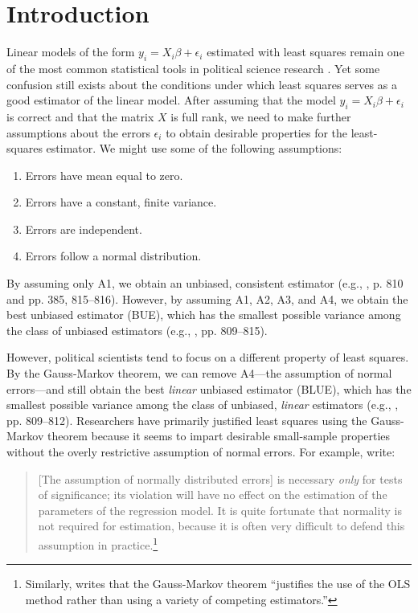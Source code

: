 \documentclass[12pt]{article}
\begin{document}

\thispagestyle{empty}

\newpage
\doublespace

\section*{Introduction}

Linear models of the form $y_i = X_i\beta + \epsilon_i$ estimated with least squares remain one of the most common statistical tools in political science research \citep{KruegerLewisBeck2008}. 
Yet some confusion still exists about the conditions under which least squares serves as a good estimator of the linear model. 
After assuming that the model $y_i = X_i\beta + \epsilon_i$ is correct and that the matrix $X$ is full rank, we need to make further assumptions about the errors $\epsilon_i$ to obtain desirable properties for the least-squares estimator. We might use some of the following assumptions:
\begin{enumerate}[label= A\arabic*:]
  \item Errors have mean equal to zero.
  \item Errors have a constant, finite variance.
  \item Errors are independent.
  \item Errors follow a normal distribution.
\end{enumerate}
By assuming only A1, we obtain an unbiased, consistent estimator (e.g., \citealt{Wooldridge2013}, p. 810 and pp. 385, 815--816). 
However, by assuming A1, A2, A3, and A4, we obtain the best unbiased estimator (BUE), which has the smallest possible variance among the class of unbiased estimators (e.g., \citealt{Wooldridge2013}, pp. 809--815).

However, political scientists tend to focus on a different property of least squares. By the Gauss-Markov theorem, we can remove A4---the assumption of normal errors---and still obtain the best \textit{linear} unbiased estimator (BLUE), which has the smallest possible variance among the class of unbiased, \textit{linear} estimators (e.g., \citealt{Wooldridge2013}, pp. 809--812). 
Researchers have primarily justified least squares using the Gauss-Markov theorem because it seems to impart desirable small-sample properties without the overly restrictive assumption of normal errors.
For example, \cite{BerryFeldman1985} write: 
\begin{quote}
[The assumption of normally distributed errors] is necessary \textit{only} for tests of significance; its violation will have no effect on the estimation of the parameters of the regression model. It is quite fortunate that normality is not required for estimation, because it is often very difficult to defend this assumption in practice.\footnote{Similarly, \citet[p. 101]{Wooldridge2013} writes that the Gauss-Markov theorem ``justifies the use of the OLS method rather than using a variety of competing estimators.''}
\end{quote}
\end{document}
